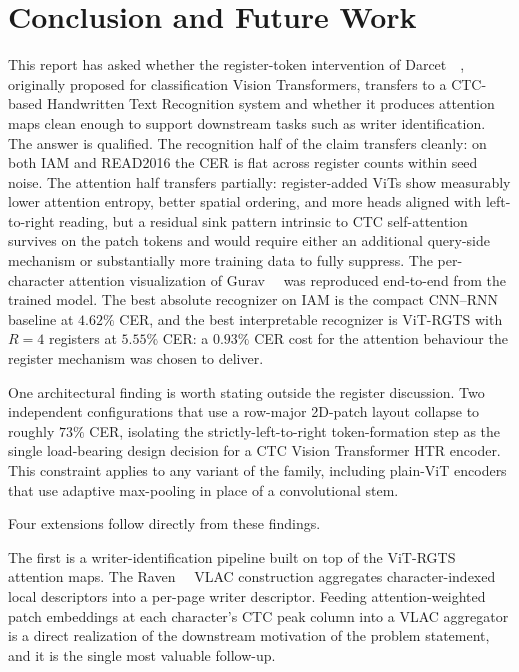 \section{Conclusion and Future Work}
\label{sec:conclusion}

This report has asked whether the register-token intervention of Darcet~\etal~\cite{darcet2024registers}, originally proposed for classification Vision Transformers, transfers to a CTC-based Handwritten Text Recognition system and whether it produces attention maps clean enough to support downstream tasks such as writer identification. The answer is qualified. The recognition half of the claim transfers cleanly: on both IAM and READ2016 the CER is flat across register counts within seed noise. The attention half transfers partially: register-added ViTs show measurably lower attention entropy, better spatial ordering, and more heads aligned with left-to-right reading, but a residual sink pattern intrinsic to CTC self-attention survives on the patch tokens and would require either an additional query-side mechanism or substantially more training data to fully suppress. The per-character attention visualization of Gurav~\etal~\cite{gurav2025beyondmem} was reproduced end-to-end from the trained model. The best absolute recognizer on IAM is the compact CNN--RNN baseline at $4.62\%$ CER, and the best interpretable recognizer is ViT-RGTS with $R = 4$ registers at $5.55\%$ CER: a $0.93\%$ CER cost for the attention behaviour the register mechanism was chosen to deliver.

One architectural finding is worth stating outside the register discussion. Two independent configurations that use a row-major 2D-patch layout collapse to roughly $73\%$ CER, isolating the strictly-left-to-right token-formation step as the single load-bearing design decision for a CTC Vision Transformer HTR encoder. This constraint applies to any variant of the family, including plain-ViT encoders that use adaptive max-pooling in place of a convolutional stem.

Four extensions follow directly from these findings.

The first is a writer-identification pipeline built on top of the ViT-RGTS attention maps. The Raven~\etal~\cite{raven2025vlac} VLAC construction aggregates character-indexed local descriptors into a per-page writer descriptor. Feeding attention-weighted patch embeddings at each character's CTC peak column into a VLAC aggregator is a direct realization of the downstream motivation of the problem statement, and it is the single most valuable follow-up.

